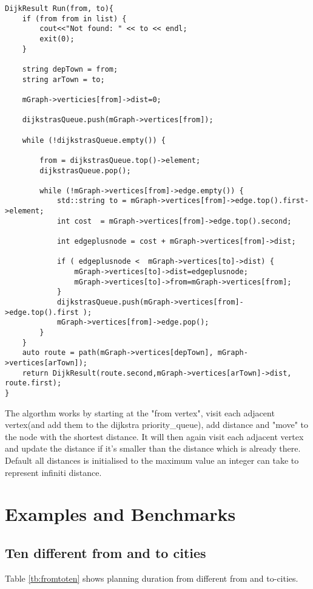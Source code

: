 \begin{lstlisting}
DijkResult Run(from, to){
	if (from from in list) {
		cout<<"Not found: " << to << endl;
		exit(0);
	}

	string depTown = from;
	string arTown = to;

	mGraph->verticies[from]->dist=0;

	dijkstrasQueue.push(mGraph->vertices[from]);

	while (!dijkstrasQueue.empty()) {

		from = dijkstrasQueue.top()->element;
		dijkstrasQueue.pop();

		while (!mGraph->vertices[from]->edge.empty()) {
			std::string to = mGraph->vertices[from]->edge.top().first->element;
			int cost  = mGraph->vertices[from]->edge.top().second;

			int edgeplusnode = cost + mGraph->vertices[from]->dist;

			if ( edgeplusnode <  mGraph->vertices[to]->dist) {
				mGraph->vertices[to]->dist=edgeplusnode;
				mGraph->vertices[to]->from=mGraph->vertices[from];
			}
			dijkstrasQueue.push(mGraph->vertices[from]->edge.top().first );
			mGraph->vertices[from]->edge.pop();
		}
	}
	auto route = path(mGraph->vertices[depTown], mGraph->vertices[arTown]);
	return DijkResult(route.second,mGraph->vertices[arTown]->dist, route.first);
}
\end{lstlisting}

The algorthm works by starting at the "from vertex", visit each adjacent vertex(and add them to the dijkstra priority_queue), add distance and "move" to the node with the shortest distance. 
It will then again visit each adjacent vertex and update the distance if it's smaller than the distance which is already there.
Default all distances is initialised to the maximum value an integer can take to represent infiniti distance.



\section{Examples and Benchmarks}
\subsection{Ten different from and to cities}
Table \ref{tb:fromtoten} shows planning duration from different from and to-cities.

